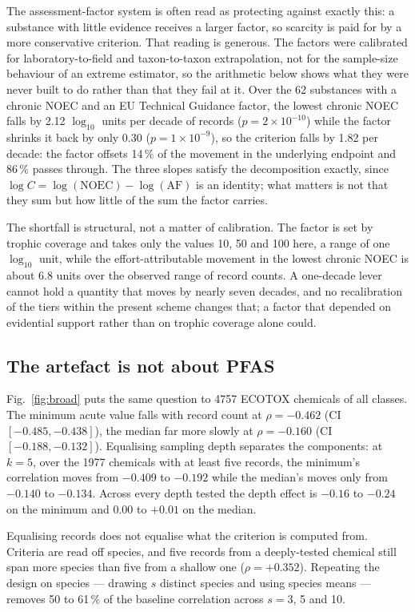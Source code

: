 \documentclass[preprint,12pt]{elsarticle}
\begin{document}
The assessment-factor system is often read as protecting against exactly this:
a substance with little evidence receives a larger factor, so scarcity is paid
for by a more conservative criterion. That reading is generous. The factors
were calibrated for laboratory-to-field and taxon-to-taxon extrapolation, not
for the sample-size behaviour of an extreme estimator, so the arithmetic below
shows what they were never built to do rather than that they fail at it. Over the 62 substances with a chronic
\textsf{NOEC} and an EU Technical Guidance factor, the lowest chronic
\textsf{NOEC} falls by 2.12 $\log_{10}$ units per decade of records
($p = 2\times10^{-10}$) while the factor shrinks it back by only 0.30
($p = 1\times10^{-9}$), so the criterion falls by 1.82 per decade: the factor offsets 14\,\% of the
movement in the underlying endpoint and 86\,\% passes through. The three
slopes satisfy the decomposition exactly, since
$\log C = \log(\text{NOEC}) - \log(\text{AF})$ is an identity; what matters
is not that they sum but how little of the sum the factor carries.

The shortfall is structural, not a matter of calibration. The factor is set by
trophic coverage and takes only the values 10, 50 and 100 here, a range of one
$\log_{10}$ unit, while the effort-attributable movement in the lowest chronic \textsf{NOEC} is
about 6.8 units over the observed range of record counts. A one-decade lever
cannot hold a quantity that moves by nearly seven decades, and no recalibration
of the tiers within the present scheme changes that; a factor that depended on
evidential support rather than on trophic coverage alone could.

\subsection{The artefact is not about PFAS}

Fig.~\ref{fig:broad} puts the same question to 4757 ECOTOX chemicals of all
classes. The minimum acute value falls with record count at $\rho = -0.462$
(CI $[-0.485, -0.438]$), the median far more slowly at $\rho = -0.160$
(CI $[-0.188, -0.132]$). Equalising sampling depth separates the components: at
$k = 5$, over the 1977 chemicals with at least five records, the minimum's
correlation moves from $-0.409$ to $-0.192$ while the median's moves only from
$-0.140$ to $-0.134$. Across every depth tested the depth effect is $-0.16$ to
$-0.24$ on the minimum and $0.00$ to $+0.01$ on the median.

Equalising records does not equalise what the criterion is computed from.
Criteria are read off species, and five records from a deeply-tested chemical
still span more species than five from a shallow one ($\rho = +0.352$).
Repeating the design on species --- drawing $s$ distinct species and using
species means --- removes 50 to 61\,\% of the baseline correlation across
$s = 3$, 5 and 10.
\end{document}
